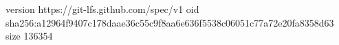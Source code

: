 version https://git-lfs.github.com/spec/v1
oid sha256:a12964f9407c178daae36c55c9f8aa6e636f5538c06051c77a72e20fa8358d63
size 136354
